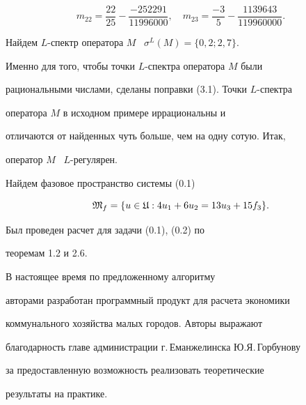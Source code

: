 \begin{equation}


m_{22} = \frac{22}{25} -\frac {-252291}{11996000},\quad


m_{23} = \frac{-3}{5} - \frac {1139643}{119960000}.


\end{equation}


Найдем $L$-спектр оператора $M$ \ $\sigma^L (M) = \{0,2; 2,7\}$.


Именно для того, чтобы точки $L$-спектра оператора $M$ были


рациональными числами, сделаны поправки (3.1). Точки $L$-спектра


оператора $M$ в исходном примере иррациональны и


отличаются от найденных чуть больше, чем на одну сотую. Итак,


оператор $M$ \ $L$-регулярен.





Найдем фазовое пространство системы (0.1)


$$


{\frak M}_f = \{u\in{\frak U} : 4 u_1 + 6 u_2 = 13 u_3 + 15 f_3\}.


$$


Был проведен расчет для задачи (0.1), (0.2) по


теоремам 1.2 и 2.6.





\begin{notes}


В настоящее время по предложенному алгоритму


авторами разработан программный продукт для расчета экономики


коммунального хозяйства малых городов. Авторы выражают


благодарность главе администрации г.\,Еманжелинска Ю.Я.\,Горбунову


за предоставленную возможность реализовать теоретические


результаты на практике.


\end{notes}





